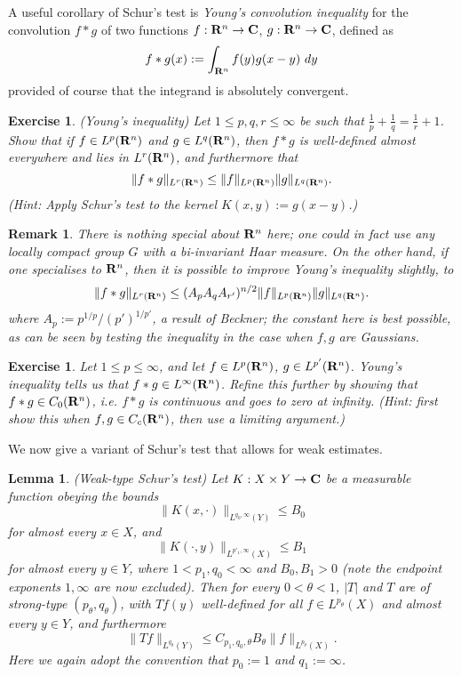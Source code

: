 \documentclass[10pt,reqno]{amsart}
\newtheorem{lemma}[theorem]{Lemma}
\newtheorem{exercise}[theorem]{Exercise}
\newtheorem{remark}[theorem]{Remark}
\begin{document}
A useful corollary of Schur’s test is \emph{Young’s convolution inequality} for the convolution $f*g$ of two functions $f: {\bf R}^n \rightarrow {\bf C}$, $g: {\bf R}^n \rightarrow {\bf C}$, defined as
%
\[ f*g(x) := \int_{{\bf R}^n} f(y) g(x-y)\ dy\]
%
provided of course that the integrand is absolutely convergent.

\begin{exercise}
    (Young’s inequality) Let $1 \leq p,q,r \leq \infty$ be such that $\frac{1}{p} + \frac{1}{q} = \frac{1}{r} + 1$. Show that if $f \in L^p({\bf R}^n)$ and $g \in L^q({\bf R}^n)$, then $f*g$ is well-defined almost everywhere and lies in $L^r({\bf R}^n)$, and furthermore that
\[     \|f*g\|_{L^r({\bf R}^n)} \leq \|f\|_{L^p({\bf R}^n)} \|g\|_{L^q({\bf R}^n)}.\]
    (Hint: Apply Schur’s test to the kernel $K(x,y) := g(x-y)$.) 
\end{exercise}

\begin{remark}
    There is nothing special about ${\bf R}^n$ here; one could in fact use any locally compact group $G$ with a bi-invariant \emph{Haar measure}. On the other hand, if one specialises to ${\bf R}^n$, then it is possible to improve Young’s inequality slightly, to
\[     \|f*g\|_{L^r({\bf R}^n)} \leq (A_p A_q A_{r'})^{n/2} \|f\|_{L^p({\bf R}^n)} \|g\|_{L^q({\bf R}^n)}.\]
    where $A_p := p^{1/p} / (p')^{1/p'}$, a \emph{result of Beckner}; the constant here is best possible, as can be seen by testing the inequality in the case when $f, g$ are Gaussians. 
\end{remark}

\begin{exercise}
    Let $1 \leq p \leq \infty$, and let $f \in L^p({\bf R}^n)$, $g \in L^{p'}({\bf R}^n)$. Young’s inequality tells us that $f*g \in L^\infty({\bf R}^n)$. Refine this further by showing that $f*g \in C_0({\bf R}^n)$, i.e. $f*g$ is continuous and goes to zero at infinity. (Hint: first show this when $f, g \in C_c({\bf R}^n)$, then use a limiting argument.) 
\end{exercise}

We now give a variant of Schur’s test that allows for weak estimates.

\begin{lemma}
    (Weak-type Schur’s test) Let $K: X \times Y \rightarrow {\bf C}$ be a measurable function obeying the bounds
    \[     \| K(x, \cdot) \|_{L^{q_0,\infty}(Y)} \leq B_0\]
    for almost every $x \in X$, and
    \[     \| K(\cdot, y) \|_{L^{p'_1,\infty}(X)} \leq B_1\]
    for almost every $y \in Y$, where $1 < p_1, q_0 < \infty$ and $B_0, B_1 > 0$ (note the endpoint exponents $1,\infty$ are now excluded). Then for every $0 < \theta < 1$, $|T|$ and $T$ are of strong-type $(p_\theta,q_\theta)$, with $Tf(y)$ well-defined for all $f \in L^{p_\theta}(X)$ and almost every $y \in Y$, and furthermore
\[     \| Tf \|_{L^{q_\theta}(Y)} \leq C_{p_1,q_0,\theta} B_\theta \| f\|_{L^{p_\theta}(X)}.\]
    Here we again adopt the convention that $p_0 := 1$ and $q_1 := \infty$. 
\end{lemma}
\end{document}
